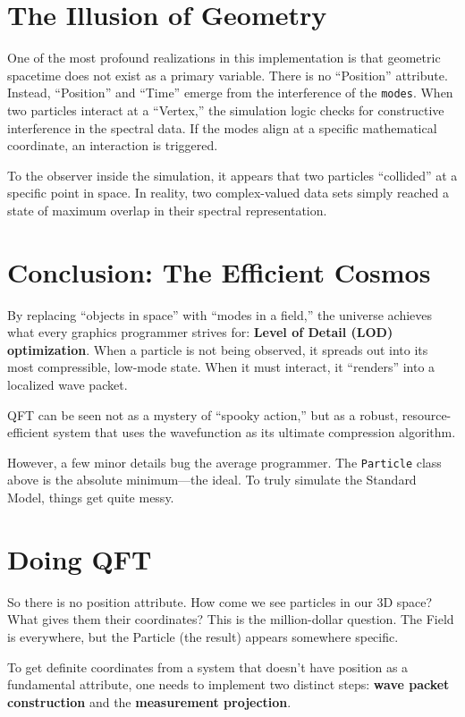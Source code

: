 \section{The Illusion of Geometry}

One of the most profound realizations in this implementation is that geometric spacetime does not exist as a primary variable. There is no ``Position'' attribute. Instead, ``Position'' and ``Time'' emerge from the interference of the \texttt{modes}. When two particles interact at a ``Vertex,'' the simulation logic checks for constructive interference in the spectral data. If the modes align at a specific mathematical coordinate, an interaction is triggered. 

To the observer inside the simulation, it appears that two particles ``collided'' at a specific point in space. In reality, two complex-valued data sets simply reached a state of maximum overlap in their spectral representation.

\section{Conclusion: The Efficient Cosmos}

By replacing ``objects in space'' with ``modes in a field,'' the universe achieves what every graphics programmer strives for: \textbf{Level of Detail (LOD) optimization}. When a particle is not being observed, it spreads out into its most compressible, low-mode state. When it must interact, it ``renders'' into a localized wave packet. 

QFT can be seen not as a mystery of ``spooky action,'' but as a robust, resource-efficient system that uses the wavefunction as its ultimate compression algorithm.

However, a few minor details bug the average programmer. The \texttt{Particle} class above is the absolute minimum---the ideal. To truly simulate the Standard Model, things get quite messy. 

\section{Doing QFT}

So there is no position attribute. How come we see particles in our 3D space? What gives them their coordinates? This is the million-dollar question. The Field is everywhere, but the Particle (the result) appears somewhere specific.

To get definite coordinates from a system that doesn't have position as a fundamental attribute, one needs to implement two distinct steps: \textbf{wave packet construction} and the \textbf{measurement projection}.

